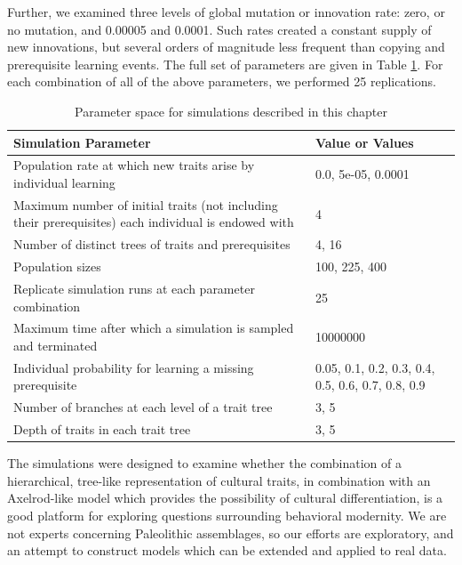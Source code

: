 \documentclass[graybox,natbib]{svmult}
\begin{document}
Further, we examined three levels of global mutation or innovation rate:
zero, or no mutation, and 0.00005 and 0.0001. Such rates created a
constant supply of new innovations, but several orders of magnitude less
frequent than copying and prerequisite learning events. The full set of
parameters are given in Table \ref{tab:axelrodct-sim-parameters}. For
each combination of all of the above parameters, we performed 25
replications.

\begin{table}[H]
\begin{tabular}{|p{}|p{}|}
\hline
\textbf{Simulation Parameter} & \textbf{Value or Values} \\ 
\hline
Population rate at which new traits arise by individual learning & 0.0, 5e-05, 0.0001\\ 
 \hline 
Maximum number of initial traits (not including their prerequisites) each individual is endowed with & 4\\ 
 \hline 
Number of distinct trees of traits and prerequisites & 4, 16\\ 
 \hline 
Population sizes & 100, 225, 400\\ 
 \hline 
Replicate simulation runs at each parameter combination & 25\\ 
 \hline 
Maximum time after which a simulation is sampled and terminated & 10000000\\ 
 \hline 
Individual probability for learning a missing prerequisite & 0.05, 0.1, 0.2, 0.3, 0.4, 0.5, 0.6, 0.7, 0.8, 0.9\\ 
 \hline 
Number of branches at each level of a trait tree & 3, 5\\ 
 \hline 
Depth of traits in each trait tree & 3, 5\\ 
 \hline 
\hline
\end{tabular}
\caption{Parameter space for simulations described in this chapter}
\label{tab:axelrodct-sim-parameters}
\end{table}



The simulations were designed to examine whether the combination of a
hierarchical, tree-like representation of cultural traits, in
combination with an Axelrod-like model which provides the possibility of
cultural differentiation, is a good platform for exploring questions
surrounding behavioral modernity. We are not experts concerning
Paleolithic assemblages, so our efforts are exploratory, and an attempt
to construct models which can be extended and applied to real data.
\end{document}
